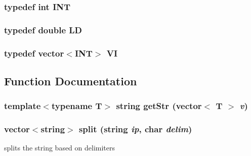\subsubsection{\setlength{\rightskip}{0pt plus 5cm}typedef int {\bf INT}}\label{main_8h_3ec28c0d79c348fc1518f2f755922cb4}


\subsubsection{\setlength{\rightskip}{0pt plus 5cm}typedef double {\bf LD}}\label{main_8h_808e5fe4d919cc8bfdf656373e8d3cf2}


\subsubsection{\setlength{\rightskip}{0pt plus 5cm}typedef vector$<${\bf INT}$>$ {\bf VI}}\label{main_8h_c99505ddce0b603a360c5be347a6b26c}




\subsection{Function Documentation}
\subsubsection{\setlength{\rightskip}{0pt plus 5cm}template$<$typename T$>$ string getStr (vector$<$ T $>$ {\em v})\hspace{0.3cm}{\tt  [inline]}}\label{main_8h_dfec805ef787e07c23d5b026b6c36d9f}


\subsubsection{\setlength{\rightskip}{0pt plus 5cm}vector$<$string$>$ split (string {\em ip}, char {\em delim})}\label{main_8h_230dd59c96e74092da88e044b72baa40}


splits the string based on delimiters 


